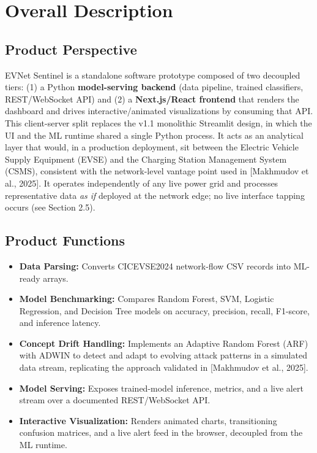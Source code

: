 \documentclass[11pt, a4paper]{article}
\begin{document}
\section{Overall Description}

\subsection{Product Perspective}
EVNet Sentinel is a standalone software prototype composed of two decoupled tiers: (1) a Python \textbf{model-serving backend} (data pipeline, trained classifiers, REST/WebSocket API) and (2) a \textbf{Next.js/React frontend} that renders the dashboard and drives interactive/animated visualizations by consuming that API. This client-server split replaces the v1.1 monolithic Streamlit design, in which the UI and the ML runtime shared a single Python process. It acts as an analytical layer that would, in a production deployment, sit between the Electric Vehicle Supply Equipment (EVSE) and the Charging Station Management System (CSMS), consistent with the network-level vantage point used in [Makhmudov et al., 2025]. It operates independently of any live power grid and processes representative data \textit{as if} deployed at the network edge; no live interface tapping occurs (see Section 2.5).

\subsection{Product Functions}
\begin{itemize}
    \item \textbf{Data Parsing:} Converts CICEVSE2024 network-flow CSV records into ML-ready arrays.
    \item \textbf{Model Benchmarking:} Compares Random Forest, SVM, Logistic Regression, and Decision Tree models on accuracy, precision, recall, F1-score, and inference latency.
    \item \textbf{Concept Drift Handling:} Implements an Adaptive Random Forest (ARF) with ADWIN to detect and adapt to evolving attack patterns in a simulated data stream, replicating the approach validated in [Makhmudov et al., 2025].
    \item \textbf{Model Serving:} Exposes trained-model inference, metrics, and a live alert stream over a documented REST/WebSocket API.
    \item \textbf{Interactive Visualization:} Renders animated charts, transitioning confusion matrices, and a live alert feed in the browser, decoupled from the ML runtime.
\end{itemize}
\end{document}
